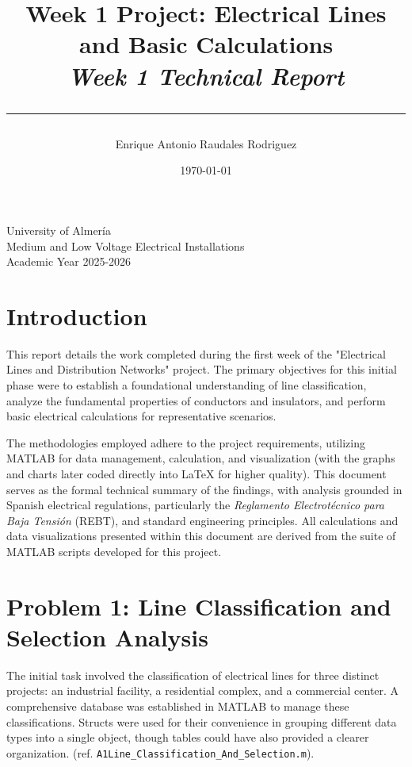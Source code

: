 \documentclass[12pt, a4paper]{article}
\title{
    \vspace{4cm} %
    \textbf{Week 1 Project: Electrical Lines and Basic Calculations} \\
    \large \textit{Week 1 Technical Report} \\
    \vspace{1cm} %
    \rule{\textwidth}{0.4pt} %
}
\author{Enrique Antonio Raudales Rodriguez}
\date{\today}
\begin{document}
\begin{titlepage}
    \maketitle
    \vfill %
    \begin{center}
        \large University of Almería \\
        Medium and Low Voltage Electrical Installations \\
        Academic Year 2025-2026
    \end{center}
\end{titlepage}

\newpage
\tableofcontents
\newpage

\section{Introduction}
This report details the work completed during the first week of the "Electrical Lines and Distribution Networks" project. The primary objectives for this initial phase were to establish a foundational understanding of line classification, analyze the fundamental properties of conductors and insulators, and perform basic electrical calculations for representative scenarios.

The methodologies employed adhere to the project requirements, utilizing MATLAB for data management, calculation, and visualization (with the graphs and charts later coded directly into LaTeX for higher quality). This document serves as the formal technical summary of the findings, with analysis grounded in Spanish electrical regulations, particularly the \textit{Reglamento Electrotécnico para Baja Tensión} (REBT), and standard engineering principles. All calculations and data visualizations presented within this document are derived from the suite of MATLAB scripts developed for this project.

\section{Problem 1: Line Classification and Selection Analysis}
The initial task involved the classification of electrical lines for three distinct projects: an industrial facility, a residential complex, and a commercial center. A comprehensive database was established in MATLAB to manage these classifications. Structs were used for their convenience in grouping different data types into a single object, though tables could have also provided a clearer organization. (ref. \texttt{A1Line\_Classification\_And\_Selection.m}).
\end{document}
